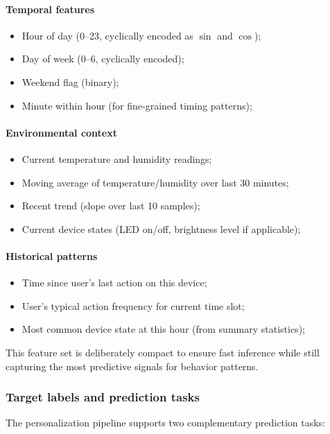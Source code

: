 \paragraph{Temporal features}
\begin{itemize}
    \item Hour of day (0--23, cyclically encoded as $\sin$ and $\cos$);
    \item Day of week (0--6, cyclically encoded);
    \item Weekend flag (binary);
    \item Minute within hour (for fine-grained timing patterns);
\end{itemize}

\paragraph{Environmental context}
\begin{itemize}
    \item Current temperature and humidity readings;
    \item Moving average of temperature/humidity over last 30 minutes;
    \item Recent trend (slope over last 10 samples);
    \item Current device states (LED on/off, brightness level if applicable);
\end{itemize}

\paragraph{Historical patterns}
\begin{itemize}
    \item Time since user's last action on this device;
    \item User's typical action frequency for current time slot;
    \item Most common device state at this hour (from summary statistics);
\end{itemize}

This feature set is deliberately compact to ensure fast inference while
still capturing the most predictive signals for behavior patterns.

\subsubsection{Target labels and prediction tasks}

The personalization pipeline supports two complementary prediction tasks:

